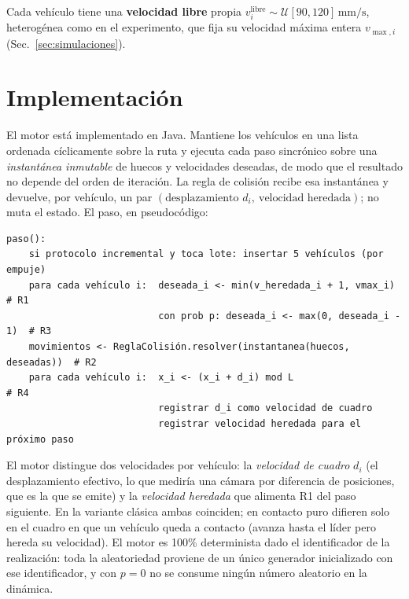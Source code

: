 \documentclass[11pt,a4paper]{article}
\newcommand{\unit}[1]{\,\mathrm{#1}}
\begin{document}
Cada vehículo tiene una \textbf{velocidad libre} propia
$v^{\mathrm{libre}}_i \sim \mathcal{U}[90,120]\unit{mm/s}$, heterogénea como en el
experimento, que fija su velocidad máxima entera $v_{\max,i}$ (Sec.~\ref{sec:simulaciones}).

\section{Implementación}

El motor está implementado en Java. Mantiene los vehículos en una lista ordenada
cíclicamente sobre la ruta y ejecuta cada paso sincrónico sobre una \emph{instantánea
inmutable} de huecos y velocidades deseadas, de modo que el resultado no depende del
orden de iteración. La regla de colisión recibe esa instantánea y devuelve, por vehículo,
un par $(\text{desplazamiento } d_i,\ \text{velocidad heredada})$; no muta el estado.
El paso, en pseudocódigo:

\begin{verbatim}
paso():
    si protocolo incremental y toca lote: insertar 5 vehículos (por empuje)
    para cada vehículo i:  deseada_i <- min(v_heredada_i + 1, vmax_i)     # R1
                           con prob p: deseada_i <- max(0, deseada_i - 1)  # R3
    movimientos <- ReglaColisión.resolver(instantanea(huecos, deseadas))  # R2
    para cada vehículo i:  x_i <- (x_i + d_i) mod L                        # R4
                           registrar d_i como velocidad de cuadro
                           registrar velocidad heredada para el próximo paso
\end{verbatim}

El motor distingue dos velocidades por vehículo: la \emph{velocidad de cuadro} $d_i$
(el desplazamiento efectivo, lo que mediría una cámara por diferencia de posiciones,
que es la que se emite) y la \emph{velocidad heredada} que alimenta R1 del paso
siguiente. En la variante clásica ambas coinciden; en contacto puro difieren solo en
el cuadro en que un vehículo queda a contacto (avanza hasta el líder pero hereda su
velocidad). El motor es 100\% determinista dado el identificador de la realización:
toda la aleatoriedad proviene de un único generador inicializado con ese identificador,
y con $p=0$ no se consume ningún número aleatorio en la dinámica.
\end{document}
